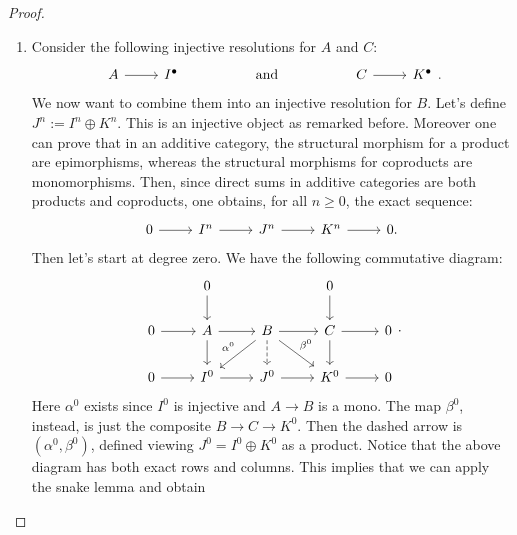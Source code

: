 \documentclass[../Main]{subfiles}
\begin{document}
\begin{proof}
\begin{enumerate}
	\item Consider the following injective resolutions for $A$ and $C$:
		\begin{equation}
		\begin{tikzcd}
				A \arrow[r, "", rightarrow] &
				I^\bullet &
				\qquad \text{ and } \qquad &
				C \arrow[r, "", rightarrow] &
				K^\bullet 
		\end{tikzcd}
		.\end{equation} 
		We now want to combine them into an injective resolution for $B$.
		Let's define $J^n := I^n \oplus K^n$. This is an injective object
		as remarked before.
		Moreover one can prove that in an additive category, the structural
		morphism for a product are epimorphisms, whereas the structural morphisms
		for coproducts are monomorphisms.
		Then, since direct sums in additive categories are both products and coproducts,
		one obtains, for all $n \geq 0$, the exact sequence:
		\begin{equation}
		\begin{tikzcd}
			0 \arrow[r, "", rightarrow] &
			I^n \arrow[r, "", rightarrow] &
			J^n \arrow[r, "", rightarrow] &
			K^n \arrow[r, "", rightarrow] &
			0.
		\end{tikzcd}
		\end{equation} 
		Then let's start at degree zero.
		We have the following commutative diagram:
		\begin{equation}
		\begin{tikzcd}
			&
			0 \arrow[d, "", rightarrow] & &
			0 \arrow[d, "", rightarrow] & \\
			0 \arrow[r, "", rightarrow] &
			A \arrow[r, "", rightarrow] \arrow[d, "", rightarrow] &
			B \arrow[r, "", rightarrow] \arrow[ld, "\alpha^0"', rightarrow] 
			\arrow[d, "", dashrightarrow] \arrow[rd, "\beta^0", rightarrow] &
			C \arrow[r, "", rightarrow] \arrow[d, "", rightarrow] &
			0 \\
			0 \arrow[r, "", rightarrow] &
			I^0 \arrow[r, "", rightarrow] &
			J^0 \arrow[r, "", rightarrow] &
			K^0 \arrow[r, "", rightarrow] &
			0
		\end{tikzcd}
		.\end{equation} 
		Here $\alpha^0$ exists since $I^0$ is injective and $A \to B$ is a mono.
		The map $\beta^0$, instead, is just the composite $B \to C \to K^0$.
		Then the dashed arrow is $\left(\alpha^0, \beta^0\right)$, defined
		viewing $J^0 = I^0 \oplus K^0$ as a product.
		Notice that the above diagram has both exact rows and columns.
		This implies that we can apply the snake lemma and obtain

\end{enumerate}
\end{proof}
\end{document}
